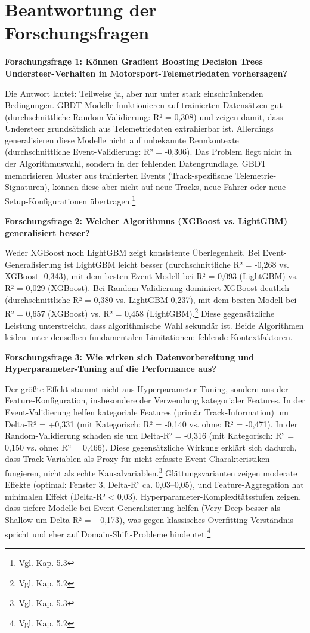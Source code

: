 \section{Beantwortung der Forschungsfragen}

\textbf{Forschungsfrage 1: Können Gradient Boosting Decision Trees Understeer-Verhalten in Motorsport-Telemetriedaten vorhersagen?}

Die Antwort lautet: Teilweise ja, aber nur unter stark einschränkenden Bedingungen. GBDT-Modelle funktionieren auf trainierten Datensätzen gut (durchschnittliche Random-Validierung: R² = 0,308) und zeigen damit, dass Understeer grundsätzlich aus Telemetriedaten extrahierbar ist. Allerdings generalisieren diese Modelle nicht auf unbekannte Rennkontexte (durchschnittliche Event-Validierung: R² = -0,306). Das Problem liegt nicht in der Algorithmuswahl, sondern in der fehlenden Datengrundlage. GBDT memorisieren Muster aus trainierten Events (Track-spezifische Telemetrie-Signaturen), können diese aber nicht auf neue Tracks, neue Fahrer oder neue Setup-Konfigurationen übertragen.\footnote{Vgl. Kap. 5.3}

\textbf{Forschungsfrage 2: Welcher Algorithmus (XGBoost vs. LightGBM) generalisiert besser?}

Weder XGBoost noch LightGBM zeigt konsistente Überlegenheit. Bei Event-Generalisierung ist LightGBM leicht besser (durchschnittliche R² = -0,268 vs. XGBoost -0,343), mit dem besten Event-Modell bei R² = 0,093 (LightGBM) vs. R² = 0,029 (XGBoost). Bei Random-Validierung dominiert XGBoost deutlich (durchschnittliche R² = 0,380 vs. LightGBM 0,237), mit dem besten Modell bei R² = 0,657 (XGBoost) vs. R² = 0,458 (LightGBM).\footnote{Vgl. Kap. 5.2} Diese gegensätzliche Leistung unterstreicht, dass algorithmische Wahl sekundär ist. Beide Algorithmen leiden unter denselben fundamentalen Limitationen: fehlende Kontextfaktoren.

\textbf{Forschungsfrage 3: Wie wirken sich Datenvorbereitung und Hyperparameter-Tuning auf die Performance aus?}

Der größte Effekt stammt nicht aus Hyperparameter-Tuning, sondern aus der Feature-Konfiguration, insbesondere der Verwendung kategorialer Features. In der Event-Validierung helfen kategoriale Features (primär Track-Information) um Delta-R² = +0,331 (mit Kategorisch: R² = -0,140 vs. ohne: R² = -0,471). In der Random-Validierung schaden sie um Delta-R² = -0,316 (mit Kategorisch: R² = 0,150 vs. ohne: R² = 0,466). Diese gegensätzliche Wirkung erklärt sich dadurch, dass Track-Variablen als Proxy für nicht erfasste Event-Charakteristiken fungieren, nicht als echte Kausalvariablen.\footnote{Vgl. Kap. 5.3} Glättungsvarianten zeigen moderate Effekte (optimal: Fenster 3, Delta-R² ca. 0,03–0,05), und Feature-Aggregation hat minimalen Effekt (Delta-R² < 0,03). Hyperparameter-Komplexitätsstufen zeigen, dass tiefere Modelle bei Event-Generalisierung helfen (Very Deep besser als Shallow um Delta-R² = +0,173), was gegen klassisches Overfitting-Verständnis spricht und eher auf Domain-Shift-Probleme hindeutet.\footnote{Vgl. Kap. 5.2}



